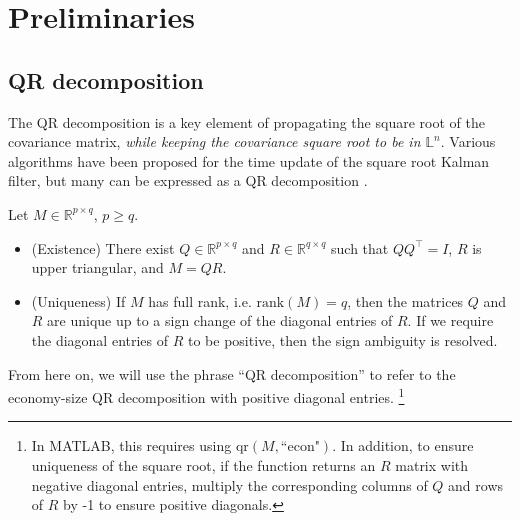 \documentclass{IEEEtran}
\begin{document}
\section{Preliminaries}

\subsection{QR decomposition}
The QR decomposition is a key element of propagating the square root of the covariance matrix, \textit{while keeping the covariance square root to be in \(\mathbb{L}^n\)}. Various algorithms have been proposed for the time update of the square root Kalman filter, but many can be expressed as a QR decomposition \cite{tapleyStatisticalOrbitDetermination2004}.

\begin{lemma}\label{lemma:existence_and_uniqueness_of_economy_size_qr_decomposition}
	Let \( M \in \mathbb{R}^{p \times q} \), \(p \geq q\). 
	\begin{itemize}
		\item (Existence) There exist \(Q \in \mathbb{R}^{p \times q}\) and \(R \in \mathbb{R}^{q \times q}\) such that \(Q Q^\top = I\), \(R\) is upper triangular, and \(M = QR\).
		\item (Uniqueness) If \(M\) has full rank, i.e. \(\mathrm{rank}(M) = q\), then the matrices \(Q\) and \(R\) are unique up to a sign change of the diagonal entries of \(R\). If we require the diagonal entries of \( R \) to be positive, then the sign ambiguity is resolved.
	\end{itemize}
\end{lemma}
From here on, we will use the phrase ``QR decomposition'' to refer to the economy-size QR decomposition with positive diagonal entries.
\footnote{In MATLAB, this requires using $\mathrm{qr}(M, \text{``econ"})$. In addition, to ensure uniqueness of the square root, if the function returns an \( R \) matrix with negative diagonal entries, multiply the corresponding columns of \( Q \) and rows of \( R \) by -1 to ensure positive diagonals.}
\end{document}

